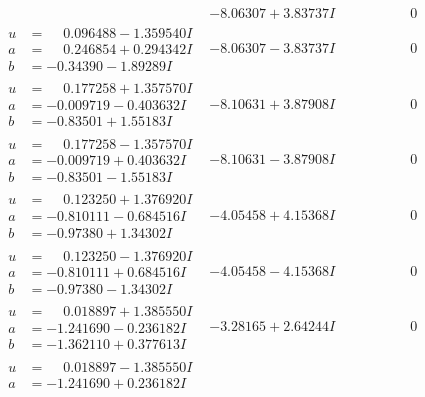 \documentclass[1p]{elsarticle_modified}
\theoremstyle{definition}
\begin{document}
$$\begin{array}{c|c|c}
 & -8.06307 + 3.83737 I & \phantom{-0.000000 } 0 \\ \hline\begin{aligned}
u &= \phantom{-}0.096488 - 1.359540 I \\
a &= \phantom{-}0.246854 + 0.294342 I \\
b &= -0.34390 - 1.89289 I\end{aligned}
 & -8.06307 - 3.83737 I & \phantom{-0.000000 } 0 \\ \hline\begin{aligned}
u &= \phantom{-}0.177258 + 1.357570 I \\
a &= -0.009719 - 0.403632 I \\
b &= -0.83501 + 1.55183 I\end{aligned}
 & -8.10631 + 3.87908 I & \phantom{-0.000000 } 0 \\ \hline\begin{aligned}
u &= \phantom{-}0.177258 - 1.357570 I \\
a &= -0.009719 + 0.403632 I \\
b &= -0.83501 - 1.55183 I\end{aligned}
 & -8.10631 - 3.87908 I & \phantom{-0.000000 } 0 \\ \hline\begin{aligned}
u &= \phantom{-}0.123250 + 1.376920 I \\
a &= -0.810111 - 0.684516 I \\
b &= -0.97380 + 1.34302 I\end{aligned}
 & -4.05458 + 4.15368 I & \phantom{-0.000000 } 0 \\ \hline\begin{aligned}
u &= \phantom{-}0.123250 - 1.376920 I \\
a &= -0.810111 + 0.684516 I \\
b &= -0.97380 - 1.34302 I\end{aligned}
 & -4.05458 - 4.15368 I & \phantom{-0.000000 } 0 \\ \hline\begin{aligned}
u &= \phantom{-}0.018897 + 1.385550 I \\
a &= -1.241690 - 0.236182 I \\
b &= -1.362110 + 0.377613 I\end{aligned}
 & -3.28165 + 2.64244 I & \phantom{-0.000000 } 0 \\ \hline\begin{aligned}
u &= \phantom{-}0.018897 - 1.385550 I \\
a &= -1.241690 + 0.236182 I \\

\end{aligned}
\end{array}$$
\end{document}
